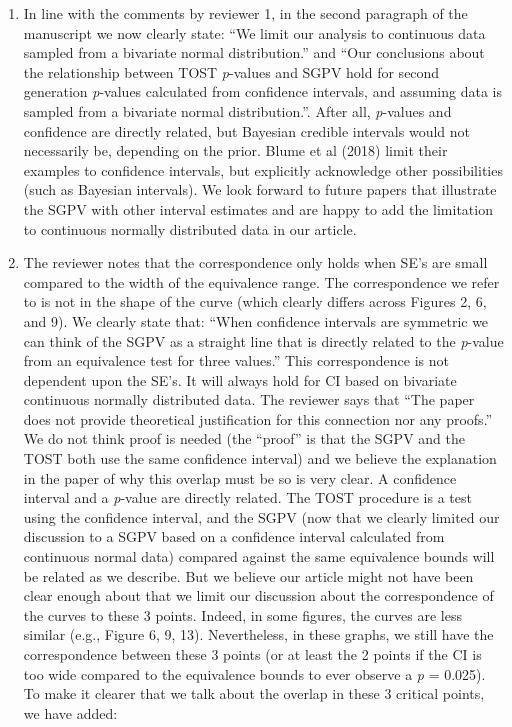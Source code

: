 \documentclass[man]{apa6}
\begin{document}
\begin{enumerate}
\def\labelenumi{\arabic{enumi}.}
\item
  In line with the comments by reviewer 1, in the second paragraph of the manuscript we now clearly state: \enquote{We limit our analysis to continuous data sampled from a bivariate normal distribution.} and \enquote{Our conclusions about the relationship between TOST \emph{p}-values and SGPV hold for second generation \emph{p}-values calculated from confidence intervals, and assuming data is sampled from a bivariate normal distribution.}. After all, \emph{p}-values and confidence are directly related, but Bayesian credible intervals would not necessarily be, depending on the prior. Blume et al (2018) limit their examples to confidence intervals, but explicitly acknowledge other possibilities (such as Bayesian intervals). We look forward to future papers that illustrate the SGPV with other interval estimates and are happy to add the limitation to continuous normally distributed data in our article.
\item
  The reviewer notes that the correspondence only holds when SE's are small compared to the width of the equivalence range. The correspondence we refer to is not in the shape of the curve (which clearly differs across Figures 2, 6, and 9). We clearly state that: \enquote{When confidence intervals are symmetric we can think of the SGPV as a straight line that is directly related to the \emph{p}-value from an equivalence test for three values.} This correspondence is not dependent upon the SE's. It will always hold for CI based on bivariate continuous normally distributed data. The reviewer says that \enquote{The paper does not provide theoretical justification for this connection nor any proofs.} We do not think proof is needed (the \enquote{proof} is that the SGPV and the TOST both use the same confidence interval) and we believe the explanation in the paper of why this overlap must be so is very clear. A confidence interval and a \emph{p}-value are directly related. The TOST procedure is a test using the confidence interval, and the SGPV (now that we clearly limited our discussion to a SGPV based on a confidence interval calculated from continuous normal data) compared against the same equivalence bounds will be related as we describe. But we believe our article might not have been clear enough about that we limit our discussion about the correspondence of the curves to these 3 points. Indeed, in some figures, the curves are less similar (e.g., Figure 6, 9, 13). Nevertheless, in these graphs, we still have the correspondence between these 3 points (or at least the 2 points if the CI is too wide compared to the equivalence bounds to ever observe a \emph{p} = 0.025). To make it clearer that we talk about the overlap in these 3 critical points, we have added:
\end{enumerate}
\end{document}

